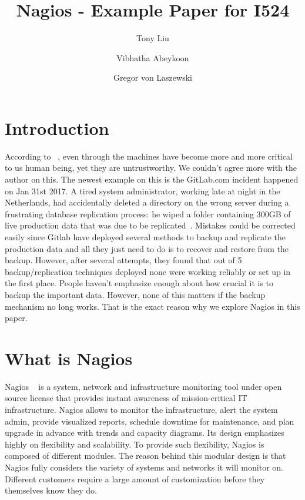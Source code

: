 \documentclass[9pt,twocolumn,twoside]{styles/osajnl}
\title{Nagios - Example Paper for I524}
\author[1]{Tony Liu}
\author[1]{Vibhatha Abeykoon}
\author[1]{Gregor von Laszewski}
\affil[1]{School of Informatics and Computing, Bloomington, IN 47408, U.S.A.}
\begin{document}
\maketitle

\section{Introduction}

According to ~\cite{nagios-book}, even through the machines have become more and 
more critical to us human being, yet they are untrustworthy. We couldn't agree more with the author on this. The newest example on this is the GitLab.com incident happened on Jan 31st 2017. A tired system administrator, working late at night in the Netherlands, had accidentally deleted a directory on the wrong server during a frustrating database replication process: he wiped a folder containing 300GB of live production data that was due to be replicated~\cite{gitlabmeltdown}. Mistakes could be corrected easily since Gitlab have deployed several methods to backup and replicate the production data and all they just need to do is to recover and restore from the backup. However, after several attempts, they found that out of 5 backup/replication techniques deployed none were working reliably or set up in the first place. People haven't emphasize enough about how crucial it is to backup the important data. However, none of this matters if the backup mechanism no long works. That is the exact reason why we explore Nagios in this paper.


\section{What is Nagios}

Nagios ~\cite{www-nagios, wiki-nagios} is a system, network and infrastructure monitoring tool under open source license that provides instant awareness of mission-critical IT infrastructure. Nagios allows to monitor the infrastructure, alert the system admin, provide visualized reports, schedule downtime for maintenance, and plan upgrade in advance with trends and capacity diagrams. Its design emphasizes highly on flexibility and scalability. To provide such flexibility, Nagios is composed of different modules. The reason behind this modular design is that Nagios fully considers the variety of systems and networks it will monitor on. Different customers require a large amount of customization before they themselves know they do.
\end{document}
